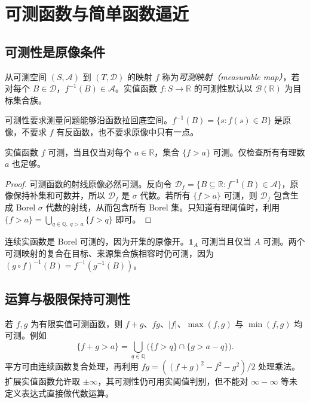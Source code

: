 \setcounter{chapter}{4} %
\chapter{可测函数与简单函数逼近}
\label{chap:mt-functions}

\section{可测性是原像条件}
\begin{definition}
从可测空间 $(S,\mathcal A)$ 到 $(T,\mathcal D)$ 的映射 $f$ 称为\emph{可测映射（measurable map）}，若对每个 $B\in\mathcal D$，$f^{-1}(B)\in\mathcal A$。实值函数 $f:S\to\mathbb R$ 的可测性默认以 $\mathcal B(\mathbb R)$ 为目标集合族。
\end{definition}
可测性要求测量问题能够沿函数拉回底空间。$f^{-1}(B)=\{s:f(s)\in B\}$ 是原像，不要求 $f$ 有反函数，也不要求原像中只有一点。

\begin{proposition}[生成族判别]
实值函数 $f$ 可测，当且仅当对每个 $a\in\mathbb R$，集合 $\{f>a\}$ 可测。仅检查所有有理数 $a$ 也足够。
\label{prop:mt-measurable-test}
\end{proposition}
\begin{proof}
可测函数的射线原像必然可测。反向令 $\mathcal D_f=\{B\subseteq\mathbb R:f^{-1}(B)\in\mathcal A\}$，原像保持补集和可数并，所以 $\mathcal D_f$ 是 $\sigma$ 代数。若所有 $\{f>a\}$ 可测，则 $\mathcal D_f$ 包含生成 Borel $\sigma$ 代数的射线，从而包含所有 Borel 集。只知道有理阈值时，利用 $\{f>a\}=\bigcup_{q\in\mathbb Q,\ q>a}\{f>q\}$ 即可。
\end{proof}

连续实函数是 Borel 可测的，因为开集的原像开。$\mathbf1_A$ 可测当且仅当 $A$ 可测。两个可测映射的复合在目标、来源集合族相容时仍可测，因为 $(g\circ f)^{-1}(B)=f^{-1}(g^{-1}(B))$。

\section{运算与极限保持可测性}
若 $f,g$ 为有限实值可测函数，则 $f+g$、$fg$、$|f|$、$\max(f,g)$ 与 $\min(f,g)$ 均可测。例如
\[
 \{f+g>a\}=\bigcup_{q\in\mathbb Q}\bigl(\{f>q\}\cap\{g>a-q\}\bigr).
\]
平方可由连续函数复合处理，再利用 $fg=((f+g)^2-f^2-g^2)/2$ 处理乘法。扩展实值函数允许取 $\pm\infty$，其可测性仍可用实阈值判别，但不能对 $\infty-\infty$ 等未定义表达式直接做代数运算。


